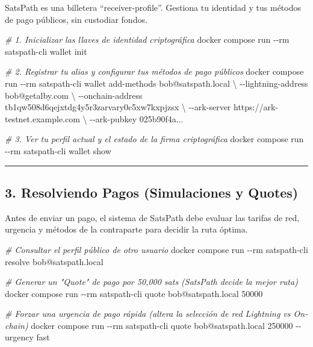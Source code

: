 \documentclass[
]{article}
\newenvironment{Shaded}{}{}
\newcommand{\AttributeTok}[1]{\textcolor[rgb]{0.49,0.56,0.16}{#1}}
\newcommand{\CommentTok}[1]{\textcolor[rgb]{0.38,0.63,0.69}{\textit{#1}}}
\newcommand{\DataTypeTok}[1]{\textcolor[rgb]{0.56,0.13,0.00}{#1}}
\newcommand{\ExtensionTok}[1]{#1}
\newcommand{\NormalTok}[1]{#1}
\begin{document}
SatsPath es una billetera ``receiver-profile''. Gestiona tu identidad y
tus métodos de pago públicos, sin custodiar fondos.

\begin{Shaded}
\begin{Highlighting}[]
\CommentTok{\# 1. Inicializar las llaves de identidad criptográfica}
\ExtensionTok{docker}\NormalTok{ compose run }\AttributeTok{{-}{-}rm}\NormalTok{ satspath{-}cli wallet init}

\CommentTok{\# 2. Registrar tu alias y configurar tus métodos de pago públicos}
\ExtensionTok{docker}\NormalTok{ compose run }\AttributeTok{{-}{-}rm}\NormalTok{ satspath{-}cli wallet add{-}methods bob@satspath.local }\DataTypeTok{\textbackslash{}}
    \AttributeTok{{-}{-}lightning{-}address}\NormalTok{ bob@getalby.com }\DataTypeTok{\textbackslash{}}
    \AttributeTok{{-}{-}onchain{-}address}\NormalTok{ tb1qw508d6qejxtdg4y5r3zarvary0c5xw7kxpjzsx }\DataTypeTok{\textbackslash{}}
    \AttributeTok{{-}{-}ark{-}server}\NormalTok{ https://ark{-}testnet.example.com }\DataTypeTok{\textbackslash{}}
    \AttributeTok{{-}{-}ark{-}pubkey}\NormalTok{ 025b90f4a...}

\CommentTok{\# 3. Ver tu perfil actual y el estado de la firma criptográfica}
\ExtensionTok{docker}\NormalTok{ compose run }\AttributeTok{{-}{-}rm}\NormalTok{ satspath{-}cli wallet show}
\end{Highlighting}
\end{Shaded}

\begin{center}\rule{0.5\linewidth}{0.5pt}\end{center}

\hypertarget{resolviendo-pagos-simulaciones-y-quotes}{%
\subsection{3. Resolviendo Pagos (Simulaciones y
Quotes)}\label{resolviendo-pagos-simulaciones-y-quotes}}

Antes de enviar un pago, el sistema de SatsPath debe evaluar las tarifas
de red, urgencia y métodos de la contraparte para decidir la ruta
óptima.

\begin{Shaded}
\begin{Highlighting}[]
\CommentTok{\# Consultar el perfil público de otro usuario}
\ExtensionTok{docker}\NormalTok{ compose run }\AttributeTok{{-}{-}rm}\NormalTok{ satspath{-}cli resolve bob@satspath.local}

\CommentTok{\# Generar un "Quote" de pago por 50,000 sats (SatsPath decide la mejor ruta)}
\ExtensionTok{docker}\NormalTok{ compose run }\AttributeTok{{-}{-}rm}\NormalTok{ satspath{-}cli quote bob@satspath.local 50000}

\CommentTok{\# Forzar una urgencia de pago rápida (altera la selección de red Lightning vs On{-}chain)}
\ExtensionTok{docker}\NormalTok{ compose run }\AttributeTok{{-}{-}rm}\NormalTok{ satspath{-}cli quote bob@satspath.local 250000 }\AttributeTok{{-}{-}urgency}\NormalTok{ fast}
\end{Highlighting}
\end{Shaded}
\end{document}
